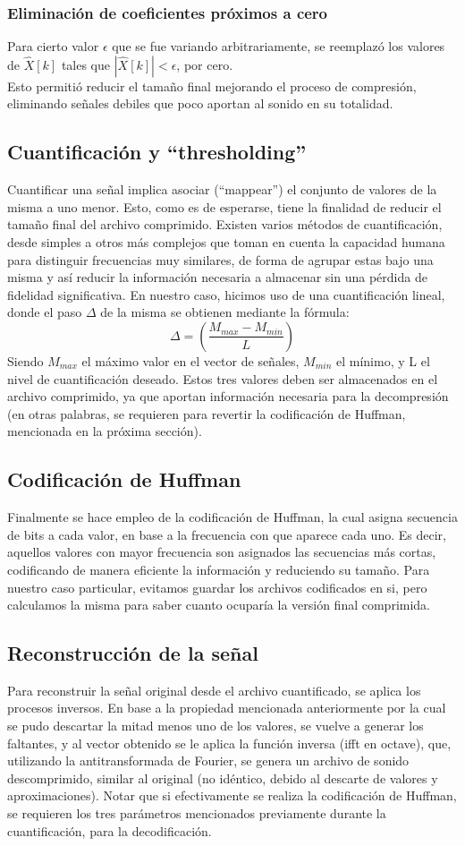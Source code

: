 \documentclass[a4paper,11pt]{article}
\begin{document}
\subsubsection{Eliminación de coeficientes próximos a cero}
Para cierto valor $\epsilon$ que se fue variando arbitrariamente, se reemplazó
los valores de $\hat{X}[k]$ tales que $|\hat{X}[k]| < \epsilon$, por cero. \\
Esto permitió reducir el tamaño final mejorando el proceso de compresión,
eliminando señales debiles que poco aportan al sonido en su totalidad.
\subsection{Cuantificación y ``thresholding''}
Cuantificar una señal implica asociar (``mappear'') el conjunto de valores de la
misma a uno menor. Esto, como es de esperarse, tiene la finalidad de
reducir el tamaño final del archivo comprimido. Existen varios métodos de
cuantificación, desde simples a otros más complejos que toman en cuenta la
capacidad humana para distinguir frecuencias muy similares, de forma de agrupar
estas bajo una misma y así reducir la información necesaria a almacenar sin una
pérdida de fidelidad significativa. En nuestro caso, hicimos uso de una
cuantificación lineal, donde el paso $\Delta$ de la misma se obtienen
mediante la fórmula:
$$\Delta = \left(\frac{M_{max} - M_{min}}{L}\right)$$
Siendo $M_{max}$ el máximo valor en el vector de señales, $M_{min}$ el mínimo,
y L el nivel de cuantificación deseado.
Estos tres valores deben ser almacenados en el archivo comprimido, ya que
aportan información necesaria para la decompresión (en otras palabras, se
requieren para revertir la codificación de Huffman, mencionada en la próxima
sección).
\subsection{Codificación de Huffman}
Finalmente se hace empleo de la codificación de Huffman, la cual asigna
secuencia de bits a cada valor, en base a la frecuencia con que aparece cada
uno. Es decir, aquellos valores con mayor frecuencia son asignados las
secuencias más cortas, codificando de manera eficiente la información y
reduciendo su tamaño.
Para nuestro caso particular, evitamos guardar los archivos codificados en si,
pero calculamos la misma para saber cuanto ocuparía la versión final
comprimida.
\subsection{Reconstrucción de la señal}
Para reconstruir la señal original desde el archivo cuantificado, se aplica los
procesos inversos. En base a la propiedad mencionada anteriormente por la cual
se pudo descartar la mitad menos uno de los valores, se vuelve a generar los
faltantes, y al vector obtenido se le aplica la función inversa (ifft en
octave), que, utilizando la antitransformada de Fourier, se genera un archivo
de sonido descomprimido, similar al original (no idéntico, debido al descarte de
valores y aproximaciones). Notar que si efectivamente se realiza la
codificación de Huffman, se requieren los tres parámetros mencionados
previamente durante la cuantificación, para la decodificación.
\end{document}

